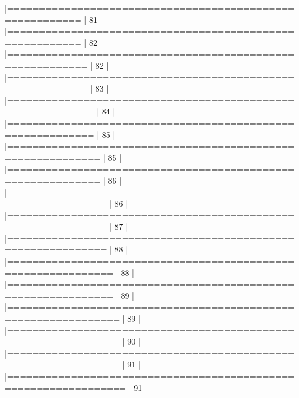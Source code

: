 \documentclass{article}
\begin{document}
\begin{Schunk}
\begin{Soutput}
  |=========================================================             |  81%
  |                                                                            
  |=========================================================             |  82%
  |                                                                            
  |==========================================================            |  82%
  |                                                                            
  |==========================================================            |  83%
  |                                                                            
  |===========================================================           |  84%
  |                                                                            
  |===========================================================           |  85%
  |                                                                            
  |============================================================          |  85%
  |                                                                            
  |============================================================          |  86%
  |                                                                            
  |=============================================================         |  86%
  |                                                                            
  |=============================================================         |  87%
  |                                                                            
  |=============================================================         |  88%
  |                                                                            
  |==============================================================        |  88%
  |                                                                            
  |==============================================================        |  89%
  |                                                                            
  |===============================================================       |  89%
  |                                                                            
  |===============================================================       |  90%
  |                                                                            
  |===============================================================       |  91%
  |                                                                            
  |================================================================      |  91%

\end{Soutput}
\end{Schunk}
\end{document}
